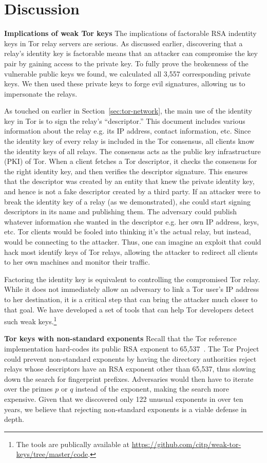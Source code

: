 \section{Discussion}
\label{sec:discussion}
\textbf{Implications of weak Tor keys}
The implications of factorable RSA indentity keys in Tor relay servers are serious. As discussed earlier, discovering that a relay's identity key is factorable means that an attacker can compromise the key pair by gaining access to the private key. To fully prove the brokenness of the vulnerable public keys we found, we calculated all 3,557 corresponding private keys. We then used these private keys to forge evil signatures, allowing us to impersonate the relays.

As touched on earlier in Section~\ref{sec:tor-network}, the main use of the identity key in Tor is to sign the relay's ``descriptor.'' This document includes various information about the relay e.g. its IP address, contact information, etc. Since the identity key of every relay is included in the Tor consensus, all clients know the identity keys of all relays. The consensus acts as the public key infrastructure (PKI) of Tor. When a client fetches a Tor descriptor, it checks the consensus for the right identity key, and then verifies the descriptor signature. This ensures that the descriptor was created by an entity that knew the private identity key, and hence is not a fake descriptor created by a third party. If an attacker were to break the identity key of a relay (as we demonstrated), she could start signing descriptors in its name and publishing them. The adversary could publish whatever information she wanted in the descriptor e.g. her own IP address, keys, etc. Tor clients would be fooled into thinking it's the actual relay, but instead, would be connecting to the attacker. Thus, one can imagine an exploit that could hack most identify keys of Tor relays, allowing the attacker to redirect all clients to her own machines and monitor their traffic.

Factoring the identity key is equivalent to controlling the compromised Tor
relay. While it does not immediately allow an adversary to link a Tor user's IP
address to her destination, it is a critical step that can bring the attacker
much closer to that goal. We have developed a set of tools that can help Tor
developers detect such weak keys.\footnote{The tools are publically available at
\url{https://github.com/citp/weak-tor-keys/tree/master/code}.}

\textbf{Tor keys with non-standard exponents} Recall that the Tor reference implementation hard-codes its public RSA exponent
to 65,537~\cite[\S~0.3]{torspec}.  The Tor Project could prevent non-standard
exponents by having the directory authorities reject relays whose descriptors
have an RSA exponent other than 65,537, thus slowing down the search for
fingerprint prefixes.  Adversaries would then have to iterate over the primes
$p$ or $q$ instead of the exponent, making the search more expensive.  Given
that we discovered only 122 unusual exponents in over ten years, we believe that
rejecting non-standard exponents is a viable defense in depth.

